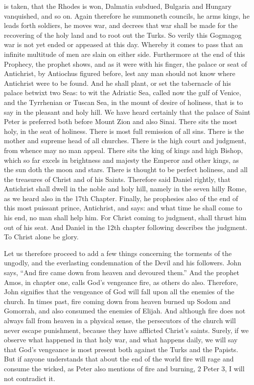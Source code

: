 is taken, that the Rhodes is won, Dalmatia subdued, Bulgaria and Hungary vanquished, and so on. Again therefore he summoneth councils, he arms kings, he leads forth soldiers, he moves war, and decrees that war shall be made for the recovering of the holy land and to root out the Turks. So verily this Gogmagog war is not yet ended or appeased at this day. Whereby it comes to pass that an infinite multitude of men are slain on either side. Furthermore at the end of this Prophecy, the prophet shows, and as it were with his finger, the palace or seat of Antichrist, by Antiochus figured before, lest any man should not know where Antichrist were to be found. And he shall plant, or set the tabernacle of his palace betwixt two Seas: to wit the Adriatic Sea, called now the gulf of Venice, and the Tyrrhenian or Tuscan Sea, in the mount of desire of holiness, that is to say in the pleasant and holy hill. We have heard certainly that the palace of Saint Peter is preferred both before Mount Zion and also Sinai. There sits the most holy, in the seat of holiness. There is most full remission of all sins. There is the mother and supreme head of all churches. There is the high court and judgment, from whence may no man appeal. There sits the king of kings and high Bishop, which so far excels in brightness and majesty the Emperor and other kings, as the sun doth the moon and stars. There is thought to be perfect holiness, and all the treasures of Christ and of his Saints. Therefore said Daniel rightly, that Antichrist shall dwell in the noble and holy hill, namely in the seven hilly Rome, as we heard also in the 17th Chapter. Finally, he prophesies also of the end of this most puissant prince, Antichrist, and says: and what time he shall come to his end, no man shall help him. For Christ coming to judgment, shall thrust him out of his seat. And Daniel in the 12th chapter following describes the judgment. To Christ alone be glory.

Let us therefore proceed to add a few things concerning the torments of the ungodly, and the everlasting condemnation of the Devil and his followers. John says, “And fire came down from heaven and devoured them.” And the prophet Amos, in chapter one, calls God’s vengeance fire, as others do also. Therefore, John signifies that the vengeance of God will fall upon all the enemies of the church. In times past, fire coming down from heaven burned up Sodom and Gomorrah, and also consumed the enemies of Elijah. And although fire does not always fall from heaven in a physical sense, the persecutors of the church will never escape punishment, because they have afflicted Christ’s saints. Surely, if we observe what happened in that holy war, and what happens daily, we will say that God’s vengeance is most present both against the Turks and the Papists. But if anyone understands that about the end of the world fire will rage and consume the wicked, as Peter also mentions of fire and burning, 2 Peter 3, I will not contradict it.

